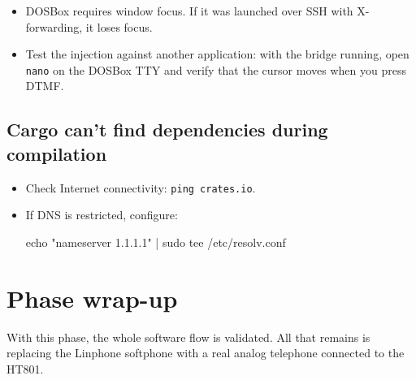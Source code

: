 \begin{itemize}
  \item DOSBox requires window focus. If it was launched over SSH with X-forwarding, it loses focus.
  \item Test the injection against another application: with the bridge running, open \texttt{nano} on the DOSBox TTY and verify that the cursor moves when you press DTMF.
\end{itemize}

\subsection{Cargo can't find dependencies during compilation}

\begin{itemize}
  \item Check Internet connectivity: \texttt{ping crates.io}.
  \item If DNS is restricted, configure:
  \begin{shellcode}
echo "nameserver 1.1.1.1" | sudo tee /etc/resolv.conf
  \end{shellcode}
\end{itemize}

\section{Phase wrap-up}

With this phase, the whole software flow is validated. All that remains is replacing the Linphone softphone with a real analog telephone connected to the HT801.
